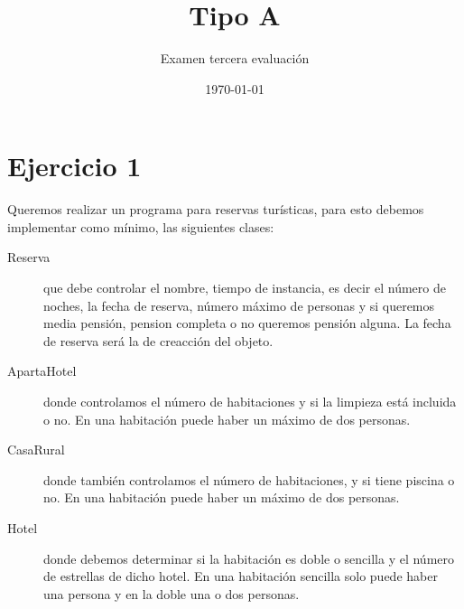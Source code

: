 \documentclass[4paper]{article}
\author{Examen tercera evaluación}
\title{Tipo A}
\date{\today}
\begin{document}
\maketitle 
\vspace{2cm}
\begin{center}
\begin{large}
\end{large}
\end{center}\par 
\vspace{0.5cm}
\section*{Ejercicio 1}
Queremos realizar un programa para reservas turísticas, para esto debemos implementar como mínimo, las siguientes clases:
\begin{description}
\item[Reserva] que debe controlar el nombre, tiempo de instancia, es decir el número de noches, la fecha de reserva, número máximo de personas y si queremos media pensión, pension completa o no queremos pensión alguna. La fecha de reserva será la de creacción del objeto.
\item[ApartaHotel] donde controlamos el número de habitaciones y si la limpieza está incluida o no. En una habitación puede haber un máximo de dos personas.
\item[CasaRural] donde también controlamos el número de habitaciones, y si tiene piscina o no. En una habitación puede haber un máximo de dos personas.
\item[Hotel] donde debemos determinar si la habitación es doble o sencilla y el  número de estrellas de dicho hotel. En una habitación sencilla solo puede haber una persona y en la doble una o dos personas.
\end{description}
\end{document}
